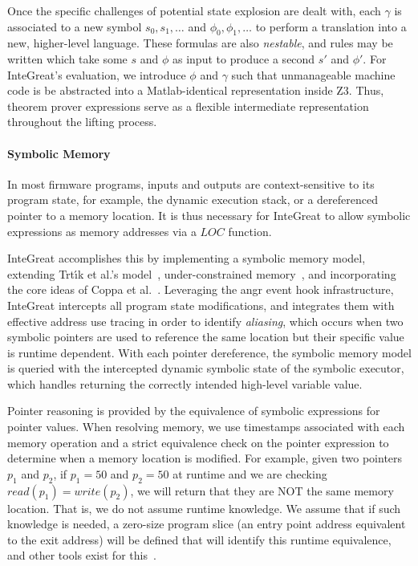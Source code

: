 Once the specific challenges of potential state explosion are dealt with, each $\gamma$ is associated to a new symbol $s_{0}, s_{1}, \dots$ and $\phi_{0}, \phi_{1}, \dots$ to perform a translation into a new, higher-level language.
These formulas are also \emph{nestable}, and rules may be written which take some $s$ and $\phi$ as input to produce a second $s'$ and $\phi'$.
For InteGreat's evaluation, we introduce $\phi$ and $\gamma$ such that unmanageable machine code is be abstracted into a Matlab-identical representation inside Z3.
Thus, theorem prover expressions serve as a flexible intermediate representation throughout the lifting process.

\paragraph{Symbolic Memory}
\label{sec:symb-mem-expl}
In most firmware programs, inputs and outputs are context-sensitive to its program state, for example, the dynamic execution stack, or a dereferenced pointer to a memory location.
It is thus necessary for InteGreat to allow symbolic expressions as memory addresses via a $LOC$ function.

InteGreat accomplishes this by implementing a symbolic memory model, extending Trt{\'\i}k et al.'s model~\cite{symbolic-memory}, under-constrained memory~\cite{Under-Constrained}, and incorporating the core ideas of Coppa et al.~\cite{coppa2017rethinking}.
Leveraging the angr event hook infrastructure, InteGreat intercepts all program state modifications, and integrates them with effective address use tracing in order to identify \emph{aliasing}, which occurs when two symbolic pointers are used to reference the same location but their specific value is runtime dependent.
With each pointer dereference, the symbolic memory model is queried with the intercepted dynamic symbolic state of the symbolic executor, which handles returning the correctly intended high-level variable value.

Pointer reasoning is provided by the equivalence of symbolic expressions for pointer values.
When resolving memory, we use timestamps associated with each memory operation and a strict equivalence check on the pointer expression to determine when a memory location is modified.
For example, given two pointers $p_{1}$ and $p_{2}$, if $p_{1} = 50$ and $p_{2} = 50$ at runtime and we are checking $read(p_{1}) = write(p_{2})$, we will return that they are NOT the same memory location. 
That is, we do not assume runtime knowledge. 
We assume that if such knowledge is needed, a zero-size program slice (an entry point address equivalent to the exit address) will be defined that will identify this runtime equivalence, and other tools exist for this~\cite{hind2001pointer}.

